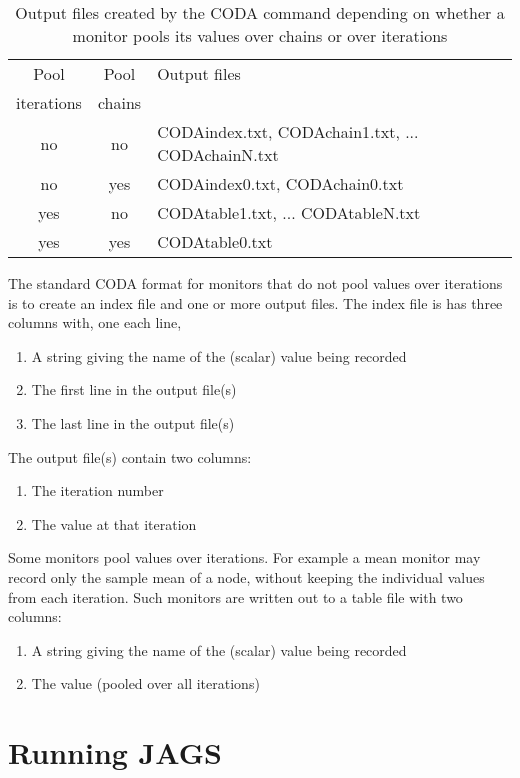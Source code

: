 \documentclass[11pt, a4paper, titlepage]{report}
\newcommand{\JAGS}{\textsf{JAGS}}
\begin{document}
\begin{table}[h]
\begin{tabular}{ccl}
\hline
Pool       & Pool   & Output files \\
iterations & chains &              \\
\hline
no         & no     & CODAindex.txt, CODAchain1.txt, ... 
                      CODAchainN.txt \\
no         & yes    & CODAindex0.txt, CODAchain0.txt \\
yes        & no     & CODAtable1.txt, ... CODAtableN.txt \\
yes        & yes    & CODAtable0.txt \\
\hline
\end{tabular}
\caption{Output files created by the CODA command depending on whether
a monitor pools its values over chains or over iterations \label{table:coda}}
\end{table}

The standard CODA format for monitors that do not pool values over
iterations is to create an index file and one or more output files.
The index file is has three columns with, one each line,
\begin{enumerate}
\item A string giving the name of the (scalar) value being recorded
\item The first line in the output file(s)
\item The last line in the output file(s)
\end{enumerate}
The output file(s) contain two columns:
\begin{enumerate}
\item The iteration number
\item The value at that iteration
\end{enumerate}

Some monitors pool values over iterations. For example a mean monitor
may record only the sample mean of a node, without keeping the
individual values from each iteration. Such monitors are written out
to a table file with two columns:
\begin{enumerate}
\item A string giving the name of the (scalar) value being recorded
\item The value (pooled over all iterations)
\end{enumerate}

\chapter{Running \JAGS}
\end{document}
